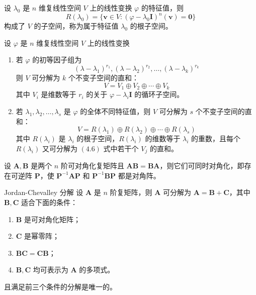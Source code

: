 \begin{definition}
    设 $\lambda_0$ 是 $n$ 维复线性空间 $V$ 上的线性变换 $\varphi$ 的特征值，则
    \[
        R(\lambda_0) = \{\bm{v} \in V : (\varphi - \lambda_0 \bm{I})^{n}(\bm{v}) = \bm{0}\}
    \]
    构成了 $V$ 的子空间，称为属于特征值 $\lambda_0$ 的根子空间。
\end{definition}

\begin{theorem}
    设 $\varphi$ 是 $n$ 维复线性空间 $V$ 上的线性变换
    \begin{enumerate}
        \item 若 $\varphi$ 的初等因子组为
              \[
                  (\lambda - \lambda_1)^{r_1}, (\lambda - \lambda_2)^{r_2}, \ldots, (\lambda - \lambda_k)^{r_k}
              \]
              则 $V$ 可分解为 $k$ 个不变子空间的直和：
              \begin{equation}
                  V = V_1 \oplus V_2 \oplus \cdots \oplus V_k
              \end{equation}
              其中 $V_i$ 是维数等于 $r_i$ 的关于 $\varphi - \lambda_{i}\bm{I}$ 的循环子空间。
        \item 若 $\lambda_1, \lambda_2, \ldots, \lambda_s$ 是 $\varphi$ 的全体不同特征值，则 $V$ 可分解为 $s$ 个不变子空间的直和：
              \begin{equation}
                  V = R(\lambda_1) \oplus R(\lambda_2) \oplus \cdots \oplus R(\lambda_s)
              \end{equation}
              其中 $R(\lambda_i)$ 是 $\lambda_i$ 的根子空间，$R(\lambda_i)$ 的维数等于 $\lambda_i$ 的重数，且每个 $R(\lambda_i)$ 又可分解为 $(4.6)$ 式中若干个 $V_j$ 的直和。
    \end{enumerate}
\end{theorem}

\begin{lemma}
    设 $\bm{A}, \bm{B}$ 是两个 $n$ 阶可对角化复矩阵且 $\bm{AB} = \bm{BA}$，则它们可同时对角化，即存在可逆阵 $\bm{P}$，使 $\bm{P}^{-1}\bm{AP}$ 和 $\bm{P}^{-1}\bm{BP}$ 都是对角阵。
\end{lemma}

\begin{theorem}{Jordan-Chevalley 分解}
    设 $\bm{A}$ 是 $n$ 阶复矩阵，则 $\bm{A}$ 可分解为 $\bm{A} = \bm{B} + \bm{C}$，其中 $\bm{B}, \bm{C}$ 适合下面的条件：
    \begin{enumerate}
        \item $\bm{B}$ 是可对角化矩阵；
        \item $\bm{C}$ 是幂零阵；
        \item $\bm{BC} = \bm{CB}$；
        \item $\bm{B}, \bm{C}$ 均可表示为 $\bm{A}$ 的多项式。
    \end{enumerate}
    且满足前三个条件的分解是唯一的。
\end{theorem}



